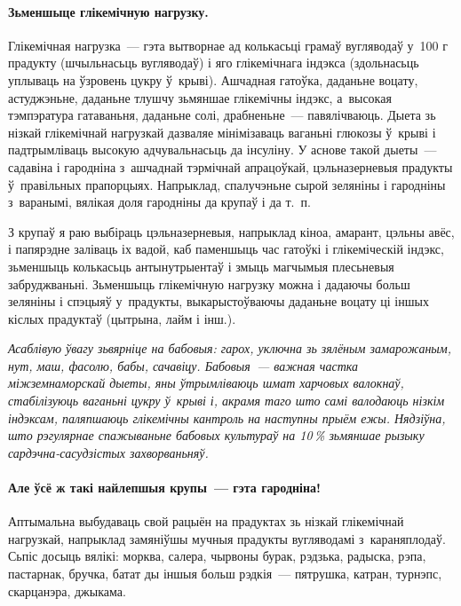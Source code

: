 \paragraph{Зьменшыце глікемічную нагрузку.} Глікемічная нагрузка~--- гэта вытворнае ад колькасьці грамаў вугляводаў у~100 г прадукту (шчыльнасьць вугляводаў) і яго глікемічнага індэкса (здольнасьць уплываць на ўзровень цукру ў~крыві). Ашчадная гатоўка, даданьне воцату, астуджэньне, даданьне тлушчу зьмяншае глікемічны індэкс, а~высокая тэмпэратура гатаваньня, даданьне солі, драбненьне~--- павялічваюць. Дыета зь нізкай глікемічнай нагрузкай дазваляе мінімізаваць ваганьні глюкозы ў~крыві і падтрымліваць высокую адчувальнасьць да інсуліну. У аснове такой дыеты~--- садавіна і гародніна з~ашчаднай тэрмічнай апрацоўкай, цэльназерневыя прадукты ў~правільных прапорцыях. Напрыклад, спалучэньне сырой зеляніны і гародніны з~варанымі, вялікая доля гародніны да крупаў і да т.~п.


З крупаў я раю выбіраць цэльназерневыя, напрыклад кіноа, амарант, цэльны авёс, і папярэдне заліваць іх вадой, каб паменшыць час гатоўкі і глікеміческій індэкс, зьменшыць колькасьць антынутрыентаў і змыць магчымыя плесьневыя забруджваньні. Зьменшыць глікемічную нагрузку можна і дадаючы больш зеляніны і спэцыяў у~прадукты, выкарыстоўваючы даданьне воцату ці іншых кіслых прадуктаў (цытрына, лайм і інш.).

\emph{Асаблівую ўвагу зьвярніце на бабовыя: гарох, уключна зь зялёным замарожаным, нут, маш, фасолю, бабы, сачавіцу. Бабовыя~--- важная частка міжземнаморскай дыеты, яны ўтрымліваюць шмат харчовых валокнаў, стабілізуюць ваганьні цукру ў~крыві і, акрамя таго што самі валодаюць нізкім індэксам, паляпшаюць глікемічны кантроль на наступны прыём ежы. Нядзіўна, што рэгулярнае спажываньне бабовых культураў на 10\,\% зьмяншае рызыку сардэчна-сасудзістых захворваньняў.}

\paragraph{Але ўсё ж такі найлепшыя крупы~--- гэта гародніна!} Аптымальна выбудаваць свой рацыён на прадуктах зь нізкай глікемічнай нагрузкай, напрыклад замяніўшы мучныя прадукты вугляводамі з~караняплодаў. Сьпіс досыць вялікі: морква, салера, чырвоны бурак, рэдзька, радыска, рэпа, пастарнак, бручка, батат ды іншыя больш рэдкія~--- пятрушка, катран, турнэпс, скарцанэра, джыкама. 

